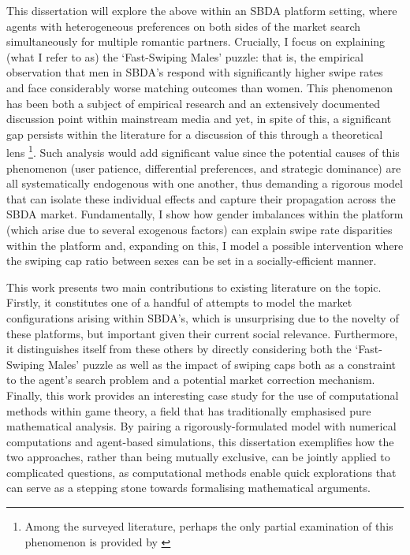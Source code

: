 This dissertation will explore the above within an SBDA platform setting, where agents with heterogeneous preferences on both sides of the market search simultaneously for multiple romantic partners.
Crucially, I focus on explaining (what I refer to as) the `Fast-Swiping Males' puzzle: that is, the empirical observation that men in SBDA's respond with significantly higher swipe rates and face considerably worse matching outcomes than women. This phenomenon has been both a subject of empirical research \citep{tyson2016first} and an extensively documented discussion point within mainstream media \citep{web:vice_tindermen, web:wp_miserabletinder} and yet, in spite of this, a significant gap persists within the literature for a discussion of this through a theoretical lens \footnote{Among the surveyed literature, perhaps the only partial examination of this phenomenon is provided by \cite{kanoria2021facilitating}}. 
Such analysis would add significant value since the potential causes of this phenomenon (user patience, differential preferences, and strategic dominance) are all systematically endogenous with one another, thus demanding a rigorous model that can isolate these individual effects and capture their propagation across the SBDA market.
Fundamentally, I show how gender imbalances within the platform (which arise due to several exogenous factors) can explain swipe rate disparities within the platform and, expanding on this, I model a possible intervention where the swiping cap ratio between sexes can be set in a socially-efficient manner.

This work presents two main contributions to existing literature on the topic. 
Firstly, it constitutes one of a handful of attempts to model the market configurations arising within SBDA's, which is unsurprising due to the novelty of these platforms, but important given their current social relevance. 
Furthermore, it distinguishes itself from these others by directly considering both the `Fast-Swiping Males' puzzle as well as the impact of swiping caps both as a constraint to the agent's search problem and a potential market correction mechanism.
Finally, this work provides an interesting case study for the use of computational methods within game theory, a field that has traditionally emphasised pure mathematical analysis. 
By pairing a rigorously-formulated model with numerical computations and agent-based simulations, this dissertation exemplifies how the two approaches, rather than being mutually exclusive, can be jointly applied to complicated questions, as computational methods enable quick explorations that can serve as a stepping stone towards formalising mathematical arguments.

